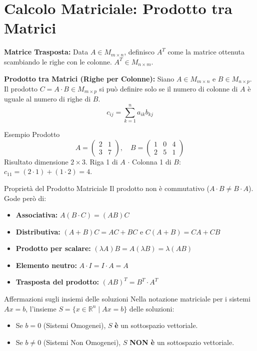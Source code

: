 \section{Calcolo Matriciale: Prodotto tra Matrici}

\begin{definitionbox}
\textbf{Matrice Trasposta:} Data $A \in M_{m \times n}$, definisco $A^T$ come la matrice ottenuta scambiando le righe con le colonne. $A^T \in M_{n \times m}$.

\textbf{Prodotto tra Matrici (Righe per Colonne):} Siano $A \in M_{m \times n}$ e $B \in M_{n \times p}$. Il prodotto $C = A \cdot B \in M_{m \times p}$ si può definire solo se il numero di colonne di $A$ è uguale al numero di righe di $B$.
$$ c_{ij} = \sum_{k=1}^n a_{ik} b_{kj} $$
\end{definitionbox}

\begin{example}{Esempio Prodotto}{}
$$
A = \begin{pmatrix} 2 & 1 \\ 3 & 7 \end{pmatrix}, \quad B = \begin{pmatrix} 1 & 0 & 4 \\ 2 & 5 & 1 \end{pmatrix}
$$
Risultato dimensione $2 \times 3$. 
Riga 1 di $A$ $\cdot$ Colonna 1 di $B$: $c_{11} = (2 \cdot 1) + (1 \cdot 2) = 4$.
\end{example}

\begin{concept}{Proprietà del Prodotto Matriciale}
Il prodotto non è commutativo ($A \cdot B \neq B \cdot A$).
Gode però di:
\begin{itemize}
    \item \textbf{Associativa:} $A(B \cdot C) = (AB)C$
    \item \textbf{Distributiva:} $(A+B)C = AC + BC$ e $C(A+B) = CA + CB$
    \item \textbf{Prodotto per scalare:} $(\lambda A)B = A(\lambda B) = \lambda(AB)$
    \item \textbf{Elemento neutro:} $A \cdot I = I \cdot A = A$
    \item \textbf{Trasposta del prodotto:} $(AB)^T = B^T \cdot A^T$
\end{itemize}
\end{concept}

\begin{proposition}{Affermazioni sugli insiemi delle soluzioni}{}
Nella notazione matriciale per i sistemi $Ax=b$, l'insieme $S = \{ x \in \mathbb{R}^n \mid Ax = b \}$ delle soluzioni:
\begin{itemize}
    \item Se $b = 0$ (Sistemi Omogenei), $S$ \textbf{è} un sottospazio vettoriale.
    \item Se $b \neq 0$ (Sistemi Non Omogenei), $S$ \textbf{NON è} un sottospazio vettoriale.
\end{itemize}
\end{proposition}

